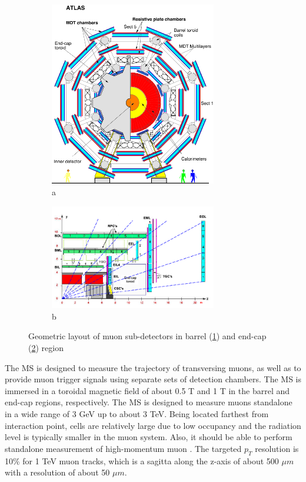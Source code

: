 \begin{figure}[htbp!]
\begin{subfigure}{.5\textwidth}
 \centering
 \includegraphics[width=0.8\textwidth]{chapters/c4/figures/mu-bar}
 \caption{a }
 \label{fig:mu-bar}
\end{subfigure}%
\begin{subfigure}{.5\textwidth}
 \centering
 \includegraphics[width=0.8\textwidth]{chapters/c4/figures/mu-end}
 \caption{b}
 \label{fig:mu-end}
\end{subfigure}
 \caption{Geometric layout of muon sub-detectors in barrel (\ref{fig:mu-bar}) and end-cap (\ref{fig:mu-end}) region}
\label{fig:mu}
\end{figure}

\par The MS \cite{CERN-LHCC-97-022} is designed to measure the trajectory of transversing muons, as well as to provide muon trigger signals using separate sets of detection chambers. The MS is immersed in a toroidal magnetic field of about 0.5 T and 1 T in the barrel and end-cap regions, respectively. The MS is designed to measure muons standalone in a wide range of 3 GeV up to about 3 TeV. Being located farthest from interaction point, cells are relatively large due to low occupancy and the radiation level is typically smaller in the muon system. Also, it should be able to perform standalone measurement of high-momentum muon \cite{muon}.
The targeted $p_T$ resolution is 10\% for 1 TeV muon tracks, which is a sagitta along the z-axis of about 500 $\mu m$ with a resolution of about 50 $\mu m$.

